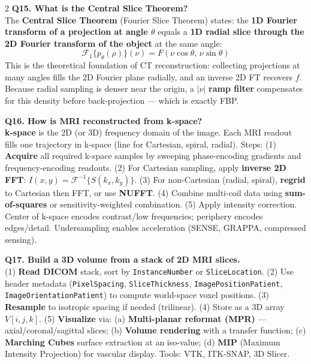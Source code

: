 \begin{paracol}{2}
\textbf{Q15. What is the Central Slice Theorem?}\\
The \textbf{Central Slice Theorem} (Fourier Slice Theorem) states: the \textbf{1D Fourier transform of a projection at angle $\theta$} equals a \textbf{1D radial slice through the 2D Fourier transform of the object} at the same angle:
$$\mathcal{F}_1\{p_\theta(\rho)\}(\nu) = F(\nu\cos\theta,\,\nu\sin\theta)$$
This is the theoretical foundation of CT reconstruction: collecting projections at many angles fills the 2D Fourier plane radially, and an inverse 2D FT recovers $f$. Because radial sampling is denser near the origin, a $|\nu|$ \textbf{ramp filter} compensates for this density before back-projection --- which is exactly FBP.

\textbf{Q16. How is MRI reconstructed from k-space?}\\
\textbf{k-space} is the 2D (or 3D) frequency domain of the image. Each MRI readout fills one trajectory in k-space (line for Cartesian, spiral, radial). Steps: (1) \textbf{Acquire} all required k-space samples by sweeping phase-encoding gradients and frequency-encoding readouts. (2) For Cartesian sampling, apply \textbf{inverse 2D FFT}: $I(x,y) = \mathcal{F}^{-1}\{S(k_x,k_y)\}$. (3) For non-Cartesian (radial, spiral), \textbf{regrid} to Cartesian then FFT, or use \textbf{NUFFT}. (4) Combine multi-coil data using \textbf{sum-of-squares} or sensitivity-weighted combination. (5) Apply intensity correction. Center of k-space encodes contrast/low frequencies; periphery encodes edges/detail. Undersampling enables acceleration (SENSE, GRAPPA, compressed sensing).

\textbf{Q17. Build a 3D volume from a stack of 2D MRI slices.}\\
(1) \textbf{Read DICOM} stack, sort by \texttt{InstanceNumber} or \texttt{SliceLocation}. (2) Use header metadata (\texttt{PixelSpacing}, \texttt{SliceThickness}, \texttt{ImagePositionPatient}, \texttt{ImageOrientationPatient}) to compute world-space voxel positions. (3) \textbf{Resample} to isotropic spacing if needed (trilinear). (4) Store as a 3D array $V[i,j,k]$. (5) \textbf{Visualize} via: (a) \textbf{Multi-planar reformat (MPR)} --- axial/coronal/sagittal slices; (b) \textbf{Volume rendering} with a transfer function; (c) \textbf{Marching Cubes} surface extraction at an iso-value; (d) \textbf{MIP} (Maximum Intensity Projection) for vascular display. Tools: VTK, ITK-SNAP, 3D Slicer.


\end{paracol}
